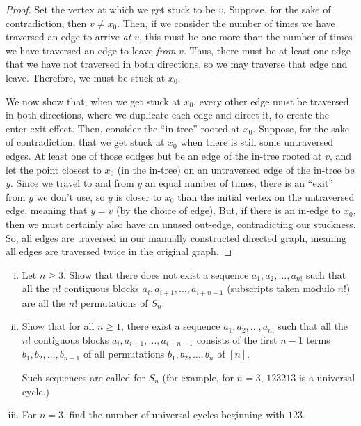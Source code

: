 \documentclass[11pt]{article}
\begin{document}
\begin{proof}
    Set the vertex at which we get stuck to be $v$. Suppose, for the sake of contradiction, then $v\neq x_0$. Then, if we consider the number of times we have traversed an edge to arrive \textit{at} $v$, this must be one more than the number of times we have traversed an edge to leave \textit{from} $v$. Thus, there must be at least one edge that we have not traversed in both directions, so we may traverse that edge and leave. Therefore, we must be stuck at $x_0$.

    We now show that, when we get stuck at $x_0$, every other edge must be traversed in both directions, where we duplicate each edge and direct it, to create the enter-exit effect. Then, consider the ``in-tree'' rooted at $x_0$. Suppose, for the sake of contradiction, that we get stuck at $x_0$ when there is still some untraversed edges. At least one of those eddges but be an edge of the in-tree rooted at $v$, and let the point closest to $x_0$ (in the in-tree) on an untraversed edge of the in-tree be $y$. Since we travel to and from $y$ an equal number of times, there is an ``exit'' from $y$ we don't use, so $y$ is closer to $x_0$ than the initial vertex on the untraversed edge, meaning that $y=v$ (by the choice of edge). But, if there is an in-edge to $x_0$, then we must certainly also have an unused out-edge, contradicting our stuckness. So, all edges are traversed in our manually constructed directed graph, meaning all edges are traversed twice in the original graph.
\end{proof}
\begin{quest}[\textcolor{red}{Universal cycles for $S_n$}]
    \begin{enumerate}[(i)]
        \item Let $n\geq 3$. Show that there does not exist a sequence $a_1,a_2,\dots,a_{n!}$ such that all the $n!$ contiguous blocks $a_{i},a_{i+1},\dots,a_{i+n-1}$ (subscripts taken modulo $n!$) are all the $n!$ permutations of $S_n$.
        \item Show that for all $n\geq 1$, there exist a sequence $a_1,a_2,\dots,a_{n!}$ such that all the $n!$ contiguous blocks $a_{i},a_{i+1},\dots,a_{i+n-1}$ consists of the first $n-1$ terms $b_1,b_2,\dots,b_{n-1}$ of all permutations $b_1,b_2,\dots,b_n$ of $[n]$. 
        
        Such sequences are called  for $S_n$ (for example, for $n=3$, $123213$ is a universal cycle.)
        \item For $n=3$, find the number of universal cycles beginning with $123$.
    \end{enumerate}
\end{quest}
\end{document}
